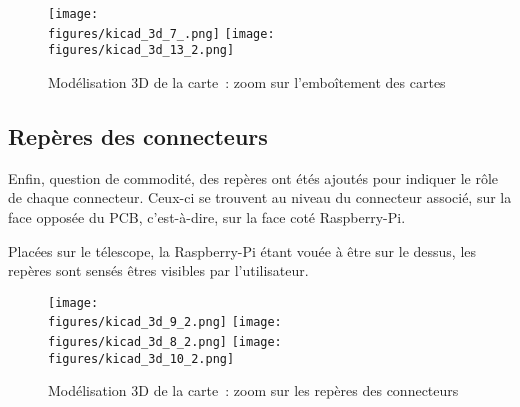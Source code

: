 \begin{figure}[H]
    \centering
    \texttt{[image: \\figures/kicad\_3d\_7\_.png]}
    \texttt{[image: \\figures/kicad\_3d\_13\_2.png]}
    \decoRule
    \caption[
    Modélisation 3D de la carte~: zoom sur l'emboîtement des cartes]{
    Modélisation 3D de la carte~: zoom sur l'emboîtement des cartes}
    \label{fig:Modélisation 3D de la carte : zoom sur l'emboîtement des cartes}
    \end{figure}

\subsection{Repères des connecteurs}

Enfin, question de commodité, des repères ont étés ajoutés pour indiquer le rôle de chaque connecteur. Ceux-ci se trouvent au niveau du connecteur associé, sur la face opposée du PCB, c'est-à-dire, sur la face coté Raspberry-Pi.

Placées sur le télescope, la Raspberry-Pi étant vouée à être sur le dessus, les repères sont sensés êtres visibles par l'utilisateur.

\begin{figure}[H]
    \centering
    \texttt{[image: \\figures/kicad\_3d\_9\_2.png]}
    \texttt{[image: \\figures/kicad\_3d\_8\_2.png]}
    \texttt{[image: \\figures/kicad\_3d\_10\_2.png]}
    \decoRule
    \caption[
    Modélisation 3D de la carte~: zoom sur les repères des connecteurs]{
    Modélisation 3D de la carte~: zoom sur les repères des connecteurs}
    \label{fig:Modélisation 3D de la carte : zoom sur les repères des connecteurs}
    \end{figure}

\vspace{1cm}

